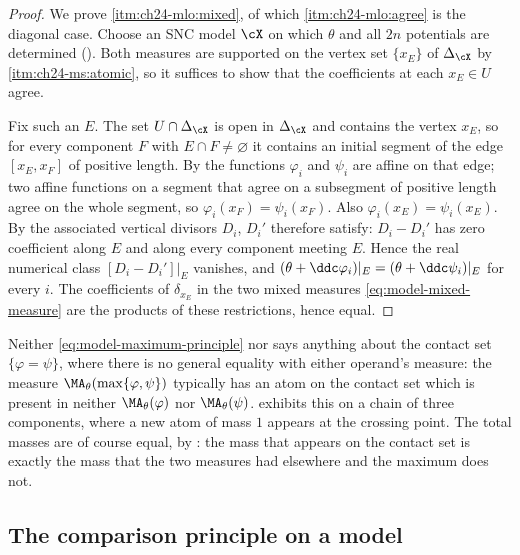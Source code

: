 \begin{proof}
We prove \cref{itm:ch24-mlo:mixed}, of which \cref{itm:ch24-mlo:agree} is the
diagonal case.  Choose an SNC model $\cX$ on which $\theta$ and all
$2n$ potentials are determined ().  Both measures
are supported on the vertex set $\{x_E\}$ of $\Delta_{\cX}$ by
\,\cref{itm:ch24-ms:atomic}, so it suffices to
show that the coefficients at each $x_E\in U$ agree.

Fix such an $E$.  The set $U\cap\Delta_{\cX}$ is open in
$\Delta_{\cX}$ and contains the vertex $x_E$, so for every component
$F$ with $E\cap F\neq\varnothing$ it contains an initial segment of the
edge $[x_E,x_F]$ of positive length.  By
 the functions $\varphi_i$ and
$\psi_i$ are affine on that edge; two affine functions on a segment that
agree on a subsegment of positive length agree on the whole segment, so
$\varphi_i(x_F)=\psi_i(x_F)$.  Also $\varphi_i(x_E)=\psi_i(x_E)$.  By
 the associated vertical divisors
$D_i$, $D_i'$ therefore satisfy: $D_i-D_i'$ has zero coefficient along
$E$ and along every component meeting $E$.  Hence the real numerical class
$[D_i-D_i']|_E$ vanishes, and
$(\theta+\ddc\varphi_i)|_E=(\theta+\ddc\psi_i)|_E$ for every $i$.  The
coefficients of $\delta_{x_E}$ in the two mixed measures
\eqref{eq:model-mixed-measure} are the products of these restrictions,
hence equal.
\end{proof}

\begin{remark}
\label{rem:ch24-contact-mass}
Neither \eqref{eq:model-maximum-principle} nor
 says anything about the contact set
$\{\varphi=\psi\}$, where there is no general equality with either
operand's measure: the measure $\MA_\theta(\max\{\varphi,\psi\})$ typically has an atom on the
contact set which is present in neither $\MA_\theta(\varphi)$ nor
$\MA_\theta(\psi)$.   exhibits this on a
chain of three components, where a new atom of mass $1$ appears at the
crossing point.  The total masses are of course equal, by
: the mass that appears on the contact set is exactly
the mass that the two measures had elsewhere and the maximum does not.
\end{remark}

\subsection{The comparison principle on a model}
\label{sec:ch24-model-comparison}

